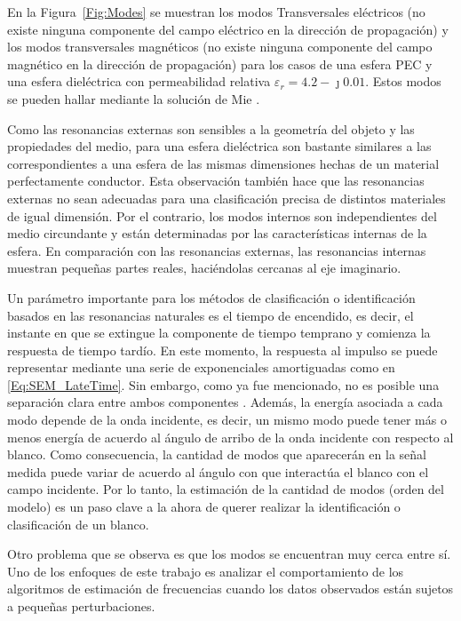 En la Figura~\ref{Fig:Modes} se muestran los modos Transversales eléctricos (no existe ninguna componente del campo eléctrico en la dirección de propagación) y los modos transversales magnéticos (no existe ninguna componente del campo magnético en la dirección de propagación) para los casos de una esfera PEC y una esfera dieléctrica con permeabilidad relativa $\varepsilon_r = 4.2-\jmath 0.01$. Estos modos se pueden hallar mediante la solución de Mie \cite{Stratton1941}.

Como las resonancias externas son sensibles a la geometría del objeto y las propiedades del medio, para una esfera dieléctrica son bastante similares a las correspondientes a una esfera de las mismas dimensiones hechas de un material perfectamente conductor. Esta observación también hace que las resonancias externas no sean adecuadas para una clasificación precisa de distintos materiales de igual dimensión. Por el contrario, los modos internos son independientes del medio circundante y están determinadas por las características internas de la esfera. En comparación con las resonancias externas, las resonancias internas muestran pequeñas partes reales, haciéndolas cercanas al eje imaginario.

Un parámetro importante para los métodos de clasificación o identificación basados en las resonancias naturales es el tiempo de encendido, es decir, el instante en que se extingue la componente de tiempo temprano y comienza la respuesta de tiempo tardío. En este momento, la respuesta al impulso se puede representar mediante una serie de exponenciales amortiguadas como en \eqref{Eq:SEM_LateTime}. Sin embargo, como ya fue mencionado, no es posible una separación clara entre ambos componentes \cite{Pearson1982}. Además, la energía asociada a cada modo depende de la onda incidente, es decir, un mismo modo puede tener más o menos energía de acuerdo al ángulo de arribo de la onda incidente con respecto al blanco. Como consecuencia, la cantidad de modos que aparecerán en la señal medida puede variar de acuerdo al ángulo con que interactúa el blanco con el campo incidente. Por lo tanto, la estimación de la cantidad de modos (orden del modelo) es un paso clave a la ahora de querer realizar la identificación o clasificación de un blanco. 

Otro problema que se observa es que los modos se encuentran muy cerca entre sí. Uno de los enfoques de este trabajo es analizar el comportamiento de los algoritmos de estimación de frecuencias cuando los datos observados están sujetos a pequeñas perturbaciones. 

